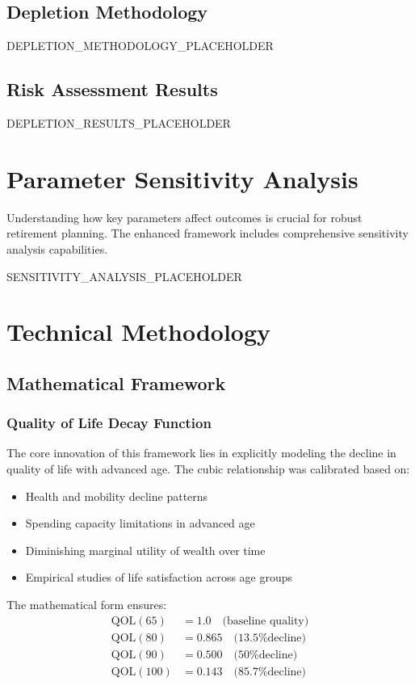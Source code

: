 \documentclass[11pt,a4paper]{article}
\begin{document}
\subsection{Depletion Methodology}
DEPLETION_METHODOLOGY_PLACEHOLDER

\subsection{Risk Assessment Results}
DEPLETION_RESULTS_PLACEHOLDER

\section{Parameter Sensitivity Analysis}

Understanding how key parameters affect outcomes is crucial for robust retirement planning. The enhanced framework includes comprehensive sensitivity analysis capabilities.

SENSITIVITY_ANALYSIS_PLACEHOLDER

\section{Technical Methodology}

\subsection{Mathematical Framework}

\subsubsection{Quality of Life Decay Function}
The core innovation of this framework lies in explicitly modeling the decline in quality of life with advanced age. The cubic relationship was calibrated based on:

\begin{itemize}
    \item Health and mobility decline patterns
    \item Spending capacity limitations in advanced age
    \item Diminishing marginal utility of wealth over time
    \item Empirical studies of life satisfaction across age groups
\end{itemize}

The mathematical form ensures:
\begin{align}
    \text{QOL}(65) &= 1.0 \quad \text{(baseline quality)} \\
    \text{QOL}(80) &= 0.865 \quad \text{(13.5\% decline)} \\
    \text{QOL}(90) &= 0.500 \quad \text{(50\% decline)} \\
    \text{QOL}(100) &= 0.143 \quad \text{(85.7\% decline)}
\end{align}
\end{document}
